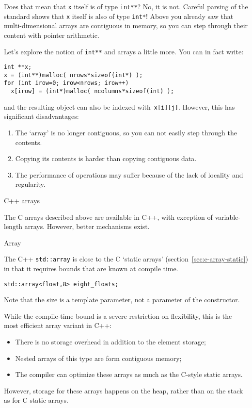 Does that mean that \lstinline{x} itself is of type \lstinline+int**+?
No, it is not.
Careful parsing of the standard shows that \lstinline{x} itself
is also of type \lstinline+int*+!
Above you already saw that multi-dimensional arrays are contiguous in memory,
so you can step through their content with pointer arithmetic.

Let's explore the notion of \lstinline+int**+ and arrays a little more.
You can in fact write:
\begin{lstlisting}
int **x;
x = (int**)malloc( nrows*sizeof(int*) );
for (int irow=0; irow<nrows; irow++)
  x[irow] = (int*)malloc( ncolumns*sizeof(int) );
\end{lstlisting}
and the resulting object can also be indexed with~\lstinline+x[i][j]+.
However, this has significant disadvantages:
\begin{enumerate}
\item The `array' is no longer contiguous, so you can not easily step through the contents.
\item Copying its contents is harder than copying contiguous data.
\item The performance of operations may suffer because of the lack of locality and regularity.
\end{enumerate}

 {C++ arrays}

The C arrays described above are available in C++,
with exception of variable-length arrays.
However, better mechanisms exist.

 {Array}

\lstset{language=C++}

The C++ \lstinline+std::array+ is close to the C `static arrays'
(section~\ref{sec:c-array-static})
in that it requires bounds that are known at compile time.
\begin{lstlisting}
std::array<float,8> eight_floats;
\end{lstlisting}
Note that the size is a template parameter, not a parameter of the constructor.

While the compile-time bound is a severe restriction on flexibility,
this is the most efficient array variant in C++:
\begin{itemize}
\item There is no storage overhead in addition to the element storage;
\item Nested arrays of this type are form contiguous memory;
\item The compiler can optimize these arrays as much as the C-style static arrays.
\end{itemize}
However, storage for these arrays happens on the heap,
rather than on the stack as for C static arrays.

